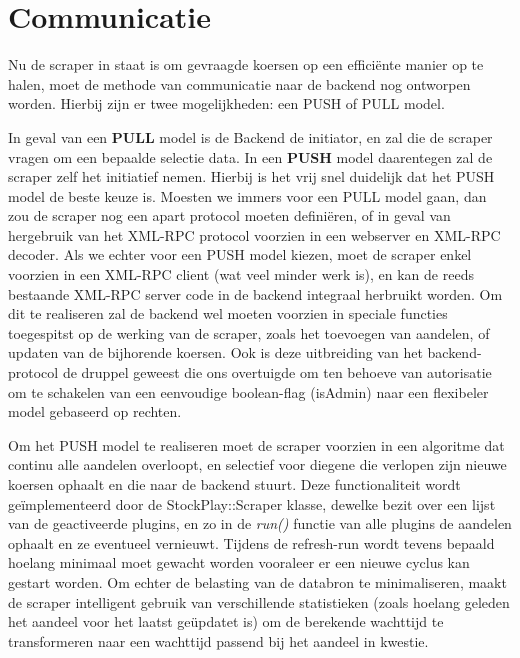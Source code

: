 \section{Communicatie}

Nu de scraper in staat is om gevraagde koersen op een effici\"ente manier op te halen, moet de methode van communicatie naar de backend nog ontworpen worden. Hierbij zijn er twee mogelijkheden: een PUSH of PULL model.

In geval van een \textbf{PULL} model is de Backend de initiator, en zal die de scraper vragen om een bepaalde selectie data. In een \textbf{PUSH} model daarentegen zal de scraper zelf het initiatief nemen. Hierbij is het vrij snel duidelijk dat het PUSH model de beste keuze is. Moesten we immers voor een PULL model gaan, dan zou de scraper nog een apart protocol moeten defini\"eren, of in geval van hergebruik van het XML-RPC protocol voorzien in een webserver en XML-RPC decoder. Als we echter voor een PUSH model kiezen, moet de scraper enkel voorzien in een XML-RPC client (wat veel minder werk is), en kan de reeds bestaande XML-RPC server code in de backend integraal herbruikt worden.
Om dit te realiseren zal de backend wel moeten voorzien in speciale functies toegespitst op de werking van de scraper, zoals het toevoegen van aandelen, of updaten van de bijhorende koersen. Ook is deze uitbreiding van het backend-protocol de druppel geweest die ons overtuigde om ten behoeve van autorisatie om te schakelen van een eenvoudige boolean-flag (isAdmin) naar een flexibeler model gebaseerd op rechten.

Om het PUSH model te realiseren moet de scraper voorzien in een algoritme dat continu alle aandelen overloopt, en selectief voor diegene die verlopen zijn nieuwe koersen ophaalt en die naar de backend stuurt. Deze functionaliteit wordt ge\"implementeerd door de StockPlay::Scraper klasse, dewelke bezit over een lijst van de geactiveerde plugins, en zo in de \emph{run()} functie van alle plugins de aandelen ophaalt en ze eventueel vernieuwt. Tijdens de refresh-run wordt tevens bepaald hoelang minimaal moet gewacht worden vooraleer er een nieuwe cyclus kan gestart worden. Om echter de belasting van de databron te minimaliseren, maakt de scraper intelligent gebruik van verschillende statistieken (zoals hoelang geleden het aandeel voor het laatst ge\"updatet is) om de berekende wachttijd te transformeren naar een wachttijd passend bij het aandeel in kwestie.


%
%

